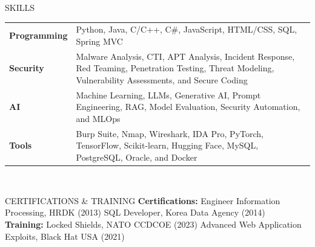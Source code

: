 \documentclass{resume}
\begin{document}
\begin{rSection}{SKILLS}
\begingroup
\renewcommand{\arraystretch}{1.5}
\begin{tabular}{ @{} >{\bfseries}l @{\hspace{2ex}} p{} }
Programming & Python, Java, C/C++, C\#, JavaScript, HTML/CSS, SQL, Spring MVC \\
Security & Malware Analysis, CTI, APT Analysis, Incident Response, Red Teaming, Penetration Testing, Threat Modeling, Vulnerability Assessments, and Secure Coding \\
AI & Machine Learning, LLMs, Generative AI, Prompt Engineering, RAG, Model Evaluation, Security Automation, and MLOps \\
Tools & Burp Suite, Nmap, Wireshark, IDA Pro, PyTorch, TensorFlow, Scikit-learn, Hugging Face, MySQL, PostgreSQL, Oracle, and Docker \\
\end{tabular}\\
\endgroup
\end{rSection}

\begin{rSection}{CERTIFICATIONS \& TRAINING}
\textbf{Certifications:} Engineer Information Processing, HRDK (2013) \quad SQL Developer, Korea Data Agency (2014) \\[0.5\baselineskip]
\textbf{Training:} Locked Shields, NATO CCDCOE (2023) \quad Advanced Web Application Exploits, Black Hat USA (2021)
\end{rSection}
\end{document}
